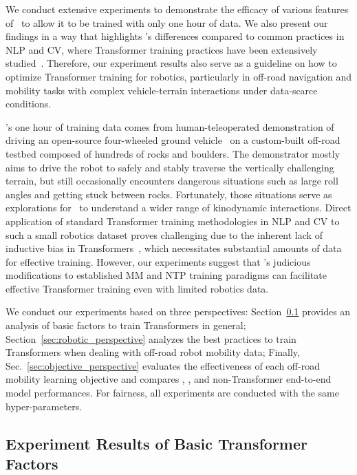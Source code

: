 We conduct extensive experiments to demonstrate the efficacy of various features of \former~to allow it to be trained with only one hour of data. We also present our findings in a way that highlights \former’s differences compared to common practices in NLP and CV, where Transformer training practices have been extensively studied~\cite{xiong2020layer, xu2021optimizing, loshchilov2024ngpt, chen2021empirical, liu2021efficient, gani2022how, steiner2022how}. 
Therefore, our experiment results also serve as a guideline on how to optimize Transformer training for robotics, particularly in off-road navigation and mobility tasks with complex vehicle-terrain interactions under data-scarce conditions. 

\former's one hour of training data comes from human-teleoperated demonstration of driving an open-source four-wheeled ground vehicle~\cite{datar2024wheeled} on a custom-built off-road testbed composed of hundreds of rocks and boulders. The demonstrator mostly aims to drive the robot to safely and stably traverse the vertically challenging terrain, but still occasionally encounters dangerous situations such as large roll angles and getting stuck between rocks. Fortunately, those situations serve as explorations for \former~to understand a wider range of kinodynamic interactions. 
Direct application of standard Transformer training methodologies in NLP and CV to such a small robotics dataset proves challenging due to the inherent lack of inductive bias in Transformers~\cite{dosovitskiy2021image}, which necessitates substantial amounts of data for effective training. However, our experiments suggest that \former's judicious modifications to established MM and NTP training paradigms can facilitate effective Transformer training even with limited robotics data. 

We conduct our experiments based on three perspectives: Section~\ref{sec:basic_perspective} provides an analysis of basic factors to train Transformers in general; Section~\ref{sec:robotic_perspective} analyzes the best practices to train Transformers when dealing with off-road robot mobility data; Finally, Sec.~\ref{sec:objective_perspective} evaluates the effectiveness of each off-road mobility learning objective and compares \encoder, \decoder, and non-Transformer end-to-end model performances. For fairness, all experiments are conducted with the same hyper-parameters. 

\subsection{Experiment Results of Basic Transformer Factors} \label{sec:basic_perspective}

